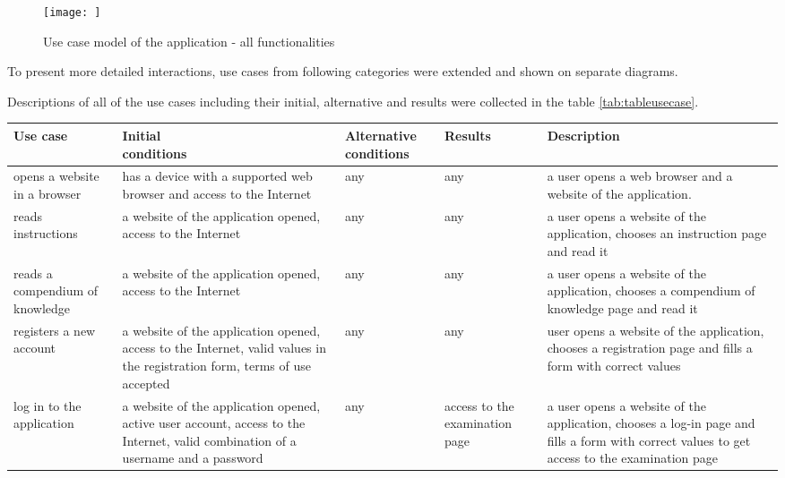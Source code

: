   \begin{figure}[ht]
\begin{center}
 \texttt{[image: ]}
 \caption{Use case model of the application - all functionalities}
 \label{functional}
 \end{center}
 \end{figure}


To present more detailed interactions, use cases from following categories were extended and shown on separate diagrams.

 
Descriptions of all of the use cases including their initial, alternative and results were collected in the table \ref{tab:tableusecase}.
\vspace{5em}

\begin{longtable}{| p{2.5cm} | p{2.3cm} | p{2.2cm} | p{2cm} | p{2.5cm} |}
\hline
\textbf{Use case}       &\parbox[t]{5cm}{\textbf{Initial\\conditions}} &\textbf{Alternative conditions} &\parbox[t]{5cm}{\textbf{Results}} &\textbf{Description}\\\hline
opens a website in a browser     &has a device with a supported web browser and access to the Internet  &any   &any   &a user opens a web browser and a website of the application. \\\hline

reads instructions      &a website of the application opened, access to the Internet       &any   &any   &a user opens a website of the application, chooses an instruction page and read it\\\hline

reads a compendium of knowledge &a website of the application opened, access to the Internet        &any   &any &a user opens a website of the application, chooses a compendium of knowledge page and read it\\\hline

registers a new account           &a website of the application opened, access to the Internet, valid values in the registration form, terms of use accepted    &any   &any &user opens a website of the application, chooses a registration page and fills a form with correct values\\\hline



log in to the application    &a website of the application opened, active user account, access to the Internet, valid combination of a username and a password           &any   &access to the examination page   &a user opens a website of the application, chooses a log-in page and fills a form with correct values to get access to the examination page\\\hline


\end{longtable}
